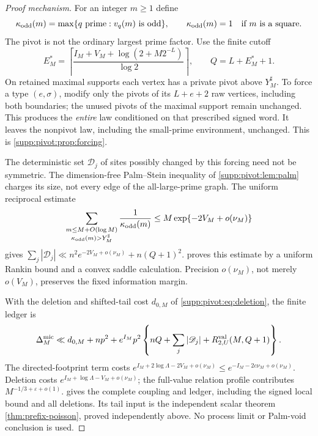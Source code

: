 \begin{proof}[Proof mechanism]
For an integer $m\ge1$ define
\[
 \kappa_{\rm odd}(m)=\max\{q\text{ prime}:v_q(m)\text{ is odd}\},
 \qquad \kappa_{\rm odd}(m)=1\quad\text{if }m\text{ is a square}.
\]
The pivot is not the ordinary largest prime factor. Use the finite cutoff
\begin{equation}\label{eq:micro-cutoff}
 E_M^*=\left\lceil
 \frac{I_M+V_M+\log(2+M2^{-L})}{\log2}\right\rceil,\qquad
 Q=L+E_M^*+1.
\end{equation}
On retained maximal supports each vertex has a private pivot above
$Y_M^\sharp$. To force a type $(e,\sigma)$, modify only the pivots of
its $L+e+2$ raw vertices, including both boundaries; the unused pivots
of the maximal support remain unchanged. This produces the
\emph{entire} law conditioned on that prescribed signed word. It leaves the nonpivot law, including the small-prime environment,
unchanged. This is \cref{supp:pivot:prop:forcing}.

The deterministic set $\mathscr D_j$ of sites possibly changed by this
forcing need not be symmetric. The dimension-free Palm--Stein inequality
of \cref{supp:pivot:lem:palm} charges its size, not every edge of the
all-large-prime graph. The uniform reciprocal estimate
\begin{equation}\label{eq:micro-reciprocal-intro}
 \sum_{\substack{m\le M+O(\log M)\\\kappa_{\rm odd}(m)>Y_M^\sharp}}
       \frac1{\kappa_{\rm odd}(m)}
 \le M\exp\{-2V_M+o(\nu_M)\}
\end{equation}
gives $\sum_j|\mathscr D_j|\ll
n^2e^{-2V_M+o(\nu_M)}+n(Q+1)^2$.
 proves this estimate by a uniform
Rankin bound and a convex saddle calculation. Precision $o(\nu_M)$,
not merely $o(V_M)$, preserves the fixed information margin.

With the deletion and shifted-tail cost $d_{0,M}$ of
\eqref{supp:pivot:eq:deletion}, the finite ledger is
\begin{equation}\label{eq:micro-ledger-main}
 \Delta_M^{\rm mic}\ll d_{0,M}+np^2+
 e^{I_M}p^2\left\{nQ+\sum_j|\mathscr D_j|
                    +R^{\rm val}_{2,U}(M,Q+1)\right\}.
\end{equation}
The directed-footprint term costs
$e^{I_M+2\log\Lambda-2V_M+o(\nu_M)}
 \le e^{-I_M-2c\nu_M+o(\nu_M)}$.
Deletion costs $e^{I_M+\log\Lambda-V_M+o(\nu_M)}$;
the full-value relation profile contributes $M^{-1/3+\varepsilon+o(1)}$.
 gives the complete coupling and
ledger, including the signed local bound and all deletions.
Its tail input is the independent scalar theorem
\cref{thm:prefix-poisson}, proved independently above.
No process limit or Palm-void conclusion is used.
\end{proof}

